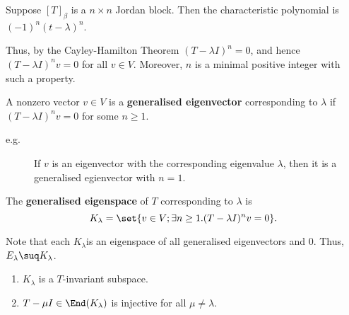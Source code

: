 \documentclass[11pt]{scrartcl}
\begin{document}
  Suppose $[T]_{\beta}$ is a $n\times n$ Jordan block. Then the characteristic polynomial is $(-1)^n(t-\lambda)^n$.

  Thus, by the Cayley-Hamilton Theorem $(T-\lambda I)^n = 0$, and
  hence $(T-\lambda I)^n v = 0$ for all $v\in V$. Moreover, $n$ is a
  minimal positive integer with such a property.

  \begin{definition}
    A nonzero vector $v\in V$ is a \textbf{generalised eigenvector} corresponding to $\lambda$ if $(T-\lambda I)^{n} v = 0$ for some $n\geq 1$.
  \end{definition}
  \begin{description}

  \item[e.g.] If $v$ is an eigenvector with the corresponding eigenvalue $\lambda$, then it is a generalised egienvector with $n = 1$.

  \end{description}

  \begin{definition}
    The \textbf{generalised eigenspace } of $T$ corresponding to $\lambda$ is
    \[K_{\lambda} = \set{v\in V; \exists n \geq 1.(T-\lambda I)^nv = 0}.\]
  \end{definition}

  Note that each $K_{\lambda}$is an eigenspace of all generalised
  eigenvectors and $0$. Thus, $E_{\lambda} \suq K_{\lambda}$.

  \begin{theorem}
    \label{sec:jord-canon-form}
    \begin{enumerate}[label=\alph*)]
    \item $K_{\lambda}$ is a $T$-invariant subspace.
    \item $T-\mu I \in \End(K_{\lambda})$ is injective for all $\mu \neq \lambda$.
    \end{enumerate}
  \end{theorem}
\end{document}
